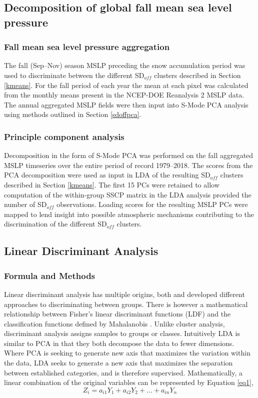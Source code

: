 \documentclass{tATO2e}
\newcommand{\sdoff}{SD$_{off}$}
\begin{document}
\subsection{Decomposition of global fall mean sea level pressure}
\subsubsection{Fall mean sea level pressure aggregation}
The fall (Sep--Nov) season MSLP preceding the snow accumulation period was used to discriminate between the different \sdoff{} clusters described in Section \ref{kmeans}. For the fall period of each year the mean at each pixel was calculated from the monthly means present in the NCEP-DOE Reanalysis 2 MSLP data. The annual aggregated MSLP fields were then input into S-Mode PCA analysis using methods outlined in Section \ref{sdoffpca}. 

\subsubsection{Principle component analysis}
Decomposition in the form of S-Mode PCA was performed on the fall aggregated MSLP timeseries over the entire period of record 1979--2018. The scores from the PCA decomposition were used as input in LDA of the resulting \sdoff{} clusters described in Section \ref{kmeans}. The first 15 PCs were retained to allow computation of the within-group SSCP matrix in the LDA analysis provided the number of \sdoff{} observations. Loading scores for the resulting MSLP PCs were mapped to lend insight into possible atmospheric mechanisms contributing to the discrimination of the different \sdoff{} clusters. 

\subsection{Linear Discriminant Analysis}
\subsubsection{Formula and Methods}
Linear discriminant analysis has multiple origins, both \cite{Fisher1936} and \cite{Mahalanobis1936} developed different approaches to discriminating between groups. There is however a mathematical relationship between Fisher’s linear discriminant functions (LDF) and the classification functions defined by Mahalanobis \citep[e.g.,][]{Kshirsagar1975}. Unlike cluster analysis, discriminant analysis assigns samples to groups or classes. Intuitively LDA is similar to PCA in that they both decompose the data to fewer dimensions. Where PCA is seeking to generate new axis that maximizes the variation within the data, LDA seeks to generate a new axis that maximizes the separation between established categories, and is therefore supervised. Mathematically, a linear combination of the original variables can be represented by Equation \ref{eq1},
\begin{equation}
	Z_{i} = a_{i1}Y_{1} + a_{i2}Y_{2} + ... + a_{in}Y_{n}
	\label{eq1}
\end{equation}
\end{document}
